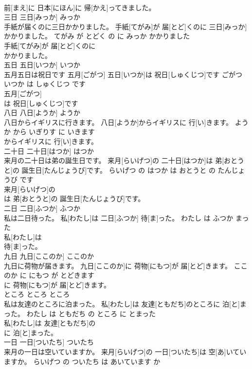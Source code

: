 \documentclass[8pt]{extreport}
\begin{document}
\begin{CJK}{UTF8}{min}
\\	前[まえ]に 日本[にほん]に 帰[かえ]ってきました。		
\\	三日	三日[みっか]	みっか	
\\	手紙が届くのに三日かかりました。	手紙[てがみ]が 届[とど]くのに 三日[みっか]かかりました。	てがみ が とどく の に みっか かかりました	
\\	手紙[てがみ]が 届[とど]くのに
\\	かかりました。		
\\	五日	五日[いつか]	いつか	
\\	五月五日は祝日です	五月[ごがつ] 五日[いつか]は 祝日[しゅくじつ]です	ごがつ いつか は しゅくじつ です	
\\	五月[ごがつ]
\\	は 祝日[しゅくじつ]です		
\\	八日	八日[ようか]	ようか	
\\	八日からイギリスに行きます。	八日[ようか]からイギリスに 行[い]きます。	ようか から いぎりす に いきます	
\\	からイギリスに 行[い]きます。		
\\	二十日	二十日[はつか]	はつか	
\\	来月の二十日は弟の誕生日です。	来月[らいげつ]の 二十日[はつか]は 弟[おとうと]の 誕生日[たんじょうび]です。	らいげつ の はつか は おとうと の たんじょうび です	
\\	来月[らいげつ]の
\\	は 弟[おとうと]の 誕生日[たんじょうび]です。		
\\	二日	二日[ふつか]	ふつか	
\\	私は二日待った。	私[わたし]は 二日[ふつか] 待[ま]った。	わたし は ふつか まった	
\\	私[わたし]は
\\	待[ま]った。		
\\	九日	九日[ここのか]	ここのか	
\\	九日に荷物が届きます。	九日[ここのか]に 荷物[にもつ]が 届[とど]きます。	ここのか に にもつ が とどきます	
\\	に 荷物[にもつ]が 届[とど]きます。		
\\	ところ	ところ	ところ	
\\	私は友達のところに泊まった。	私[わたし]は 友達[ともだち]のところに 泊[と]まった。	わたし は ともだち の ところ に とまった	
\\	私[わたし]は 友達[ともだち]の
\\	に 泊[と]まった。		
\\	一日	一日[ついたち]	ついたち	
\\	来月の一日は空いていますか。	来月[らいげつ]の 一日[ついたち]は 空[あ]いていますか。	らいげつ の ついたち は あいています か	

\end{CJK}
\end{document}
